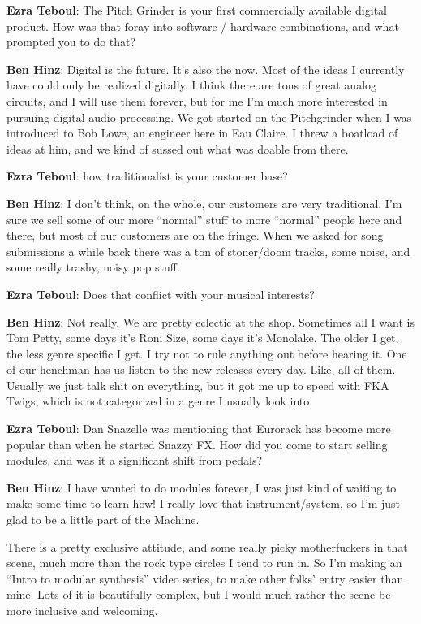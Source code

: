 \textbf{Ezra Teboul}: The Pitch Grinder is your first commercially available digital product. How was that foray into software / hardware combinations, and what prompted you to do that? 

\textbf{Ben Hinz}: Digital is the future. It's also the now. Most of the ideas I currently have could only be realized digitally. I think there are tons of great analog circuits, and I will use them forever, but for me I'm much more interested in pursuing digital audio processing. We got started on the Pitchgrinder when I was introduced to Bob Lowe, an engineer here in Eau Claire. I threw a boatload of ideas at him, and we kind of sussed out what was doable from there.

\textbf{Ezra Teboul}: how traditionalist is your customer base? 

\textbf{Ben Hinz}: I don't think, on the whole, our customers are very traditional. I'm sure we sell some of our more ``normal'' stuff to more ``normal'' people here and there, but most of our customers are on the fringe. When we asked for song submissions a while back there was a ton of stoner/doom tracks, some noise, and some really trashy, noisy pop stuff.  

\textbf{Ezra Teboul}: Does that conflict with your musical interests? 

\textbf{Ben Hinz}: Not really. We are pretty eclectic at the shop. Sometimes all I want is Tom Petty, some days it’s Roni Size, some days it's Monolake. The older I get, the less genre specific I get. I try not to rule anything out before hearing it. One of our henchman has us listen to the new releases every day. Like, all of them. Usually we just talk shit on everything, but it got me up to speed with FKA Twigs, which is not categorized in a genre I usually look into. 

\textbf{Ezra Teboul}: Dan Snazelle was mentioning that Eurorack has become more popular than when he started Snazzy FX. How did you come to start selling modules, and was it a significant shift from pedals? 

\textbf{Ben Hinz}: I have wanted to do modules forever, I was just kind of waiting to make some time to learn how! I really love that instrument/system, so I'm just glad to be a little part of the Machine. 

There is a pretty exclusive attitude, and some really picky motherfuckers in that scene, much more than the rock type circles I tend to run in. So I'm making an ``Intro to modular synthesis'' video series, to make other folks' entry easier than mine.  Lots of it is beautifully complex, but I would much rather the scene be more inclusive and welcoming.

